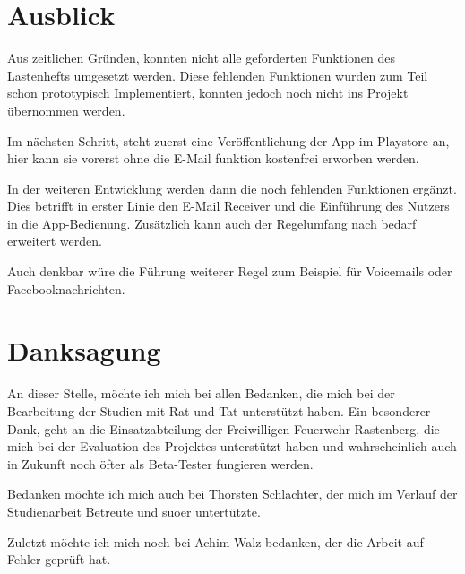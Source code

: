 \section{Ausblick}
Aus zeitlichen Gr\"unden, konnten nicht alle geforderten Funktionen des Lastenhefts umgesetzt werden. Diese fehlenden Funktionen wurden zum Teil schon prototypisch Implementiert, konnten jedoch noch nicht ins Projekt \"ubernommen werden.

Im n\"achsten Schritt, steht zuerst eine Ver\"offentlichung der App im Playstore an, hier kann sie vorerst ohne die E-Mail funktion kostenfrei erworben werden.

In der weiteren Entwicklung werden dann die noch fehlenden Funktionen erg\"anzt. Dies betrifft in erster Linie den E-Mail Receiver und die Einf\"uhrung des Nutzers in die App-Bedienung. Zus\"atzlich kann auch der Regelumfang nach bedarf erweitert werden. 

Auch denkbar w\"ure die F\"uhrung weiterer Regel zum Beispiel f\"ur Voicemails oder Facebooknachrichten.

\section{Danksagung}
An dieser Stelle, m\"ochte ich mich bei allen Bedanken, die mich bei der Bearbeitung der Studien mit Rat und Tat unterst\"utzt haben.
Ein besonderer Dank, geht an die Einsatzabteilung der Freiwilligen Feuerwehr Rastenberg, die mich bei der Evaluation des Projektes unterst\"utzt haben und wahrscheinlich auch in Zukunft noch \"ofter als Beta-Tester fungieren werden.

Bedanken m\"ochte ich mich auch bei Thorsten Schlachter, der mich im Verlauf der Studienarbeit Betreute und suoer untert\"utzte.

Zuletzt m\"ochte ich mich noch bei Achim Walz bedanken, der die Arbeit auf Fehler gepr\"uft hat. 